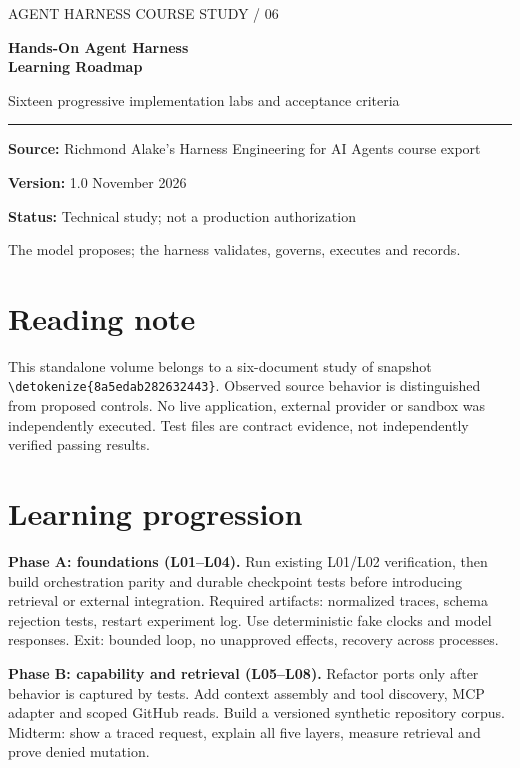 \documentclass[11pt,letterpaper]{article}
\newcommand{\src}[1]{\expandafter\nolinkurl\expandafter{\detokenize{#1}}}
\begin{document}
\begin{titlepage}
\vspace*{1.25in}
{\color{teal}\large AGENT HARNESS COURSE STUDY / 06\par}\vspace{.3in}
{\color{navy}\Huge\bfseries Hands-On Agent Harness\\Learning Roadmap\par}\vspace{.18in}
{\Large Sixteen progressive implementation labs and acceptance criteria\par}\vspace{.5in}
\rule{\linewidth}{1pt}\par
\textbf{Source:} Richmond Alake's Harness Engineering for AI Agents course export\par
\textbf{Version:} 1.0  November 2026\par
\textbf{Status:} Technical study; not a production authorization\par
\vfill
The model proposes; the harness validates, governs, executes and records.
\end{titlepage}
\tableofcontents\clearpage
\section*{Reading note}
This standalone volume belongs to a six-document study of snapshot \src{8a5edab282632443}. Observed source behavior is distinguished from proposed controls. No live application, external provider or sandbox was independently executed. Test files are contract evidence, not independently verified passing results.

\section{Learning progression}
\textbf{Phase A: foundations (L01--L04).} Run existing L01/L02 verification, then build orchestration parity and durable checkpoint tests before introducing retrieval or external integration. Required artifacts: normalized traces, schema rejection tests, restart experiment log. Use deterministic fake clocks and model responses. Exit: bounded loop, no unapproved effects, recovery across processes.

\textbf{Phase B: capability and retrieval (L05--L08).} Refactor ports only after behavior is captured by tests. Add context assembly and tool discovery, MCP adapter and scoped GitHub reads. Build a versioned synthetic repository corpus. Midterm: show a traced request, explain all five layers, measure retrieval and prove denied mutation.
\end{document}
